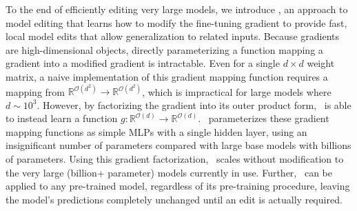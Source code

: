 \documentclass{article}
\begin{document}
To the end of efficiently editing very large models, we introduce \name, an approach to model editing that learns how to modify the fine-tuning gradient to provide fast, local model edits that allow generalization to related inputs. Because gradients are high-dimensional objects, directly parameterizing a function mapping a gradient into a modified gradient is intractable. Even for a single  $d \times d$ weight matrix, a naive implementation of this gradient mapping function requires a mapping from $\mathbb{R}^{\mathcal{O}(d^2)} \rightarrow \mathbb{R}^{\mathcal{O}(d^2)}$, which is impractical for large models where $d\sim10^3$. However, by factorizing the gradient into its outer product form, \name~is able to instead learn a function $g:\mathbb{R}^{\mathcal{O}(d)} \rightarrow \mathbb{R}^{\mathcal{O}(d)}$. \name~parameterizes these gradient mapping functions as simple MLPs with a single hidden layer, using an insignificant number of parameters compared with large base models with billions of parameters. Using this gradient factorization, \name~scales without modification to the very large (billion+ parameter) models currently in use. Further, \name~can be applied to any pre-trained model, regardless of its pre-training procedure, leaving the model's predictions completely unchanged until an edit is actually required.
\end{document}
